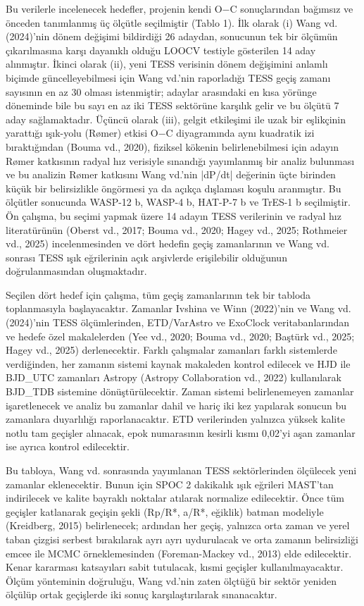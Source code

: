 Bu verilerle incelenecek hedefler, projenin kendi O−C sonuçlarından bağımsız ve önceden tanımlanmış üç ölçütle seçilmiştir (Tablo 1). İlk olarak (i) Wang vd. (2024)'nin dönem değişimi bildirdiği 26 adaydan, sonucunun tek bir ölçümün çıkarılmasına karşı dayanıklı olduğu LOOCV testiyle gösterilen 14 aday alınmıştır. İkinci olarak (ii), yeni TESS verisinin dönem değişimini anlamlı biçimde güncelleyebilmesi için Wang vd.'nin raporladığı TESS geçiş zamanı sayısının en az 30 olması istenmiştir; adaylar arasındaki en kısa yörünge döneminde bile bu sayı en az iki TESS sektörüne karşılık gelir ve bu ölçütü 7 aday sağlamaktadır. Üçüncü olarak (iii), gelgit etkileşimi ile uzak bir eşlikçinin yarattığı ışık-yolu (Rømer) etkisi O−C diyagramında aynı kuadratik izi bıraktığından (Bouma vd., 2020), fiziksel kökenin belirlenebilmesi için adayın Rømer katkısının radyal hız verisiyle sınandığı yayımlanmış bir analiz bulunması ve bu analizin Rømer katkısını Wang vd.'nin |dP/dt| değerinin üçte birinden küçük bir belirsizlikle öngörmesi ya da açıkça dışlaması koşulu aranmıştır. Bu ölçütler sonucunda WASP-12 b, WASP-4 b, HAT-P-7 b ve TrES-1 b seçilmiştir. Ön çalışma, bu seçimi yapmak üzere 14 adayın TESS verilerinin ve radyal hız literatürünün (Oberst vd., 2017; Bouma vd., 2020; Hagey vd., 2025; Rothmeier vd., 2025) incelenmesinden ve dört hedefin geçiş zamanlarının ve Wang vd. sonrası TESS ışık eğrilerinin açık arşivlerde erişilebilir olduğunun doğrulanmasından oluşmaktadır.

Seçilen dört hedef için çalışma, tüm geçiş zamanlarının tek bir tabloda toplanmasıyla başlayacaktır. Zamanlar Ivshina ve Winn (2022)'nin ve Wang vd. (2024)'nin TESS ölçümlerinden, ETD/VarAstro ve ExoClock veritabanlarından ve hedefe özel makalelerden (Yee vd., 2020; Bouma vd., 2020; Baştürk vd., 2025; Hagey vd., 2025) derlenecektir. Farklı çalışmalar zamanları farklı sistemlerde verdiğinden, her zamanın sistemi kaynak makaleden kontrol edilecek ve HJD ile BJD\_UTC zamanları Astropy (Astropy Collaboration vd., 2022) kullanılarak BJD\_TDB sistemine dönüştürülecektir. Zaman sistemi belirlenemeyen zamanlar işaretlenecek ve analiz bu zamanlar dahil ve hariç iki kez yapılarak sonucun bu zamanlara duyarlılığı raporlanacaktır. ETD verilerinden yalnızca yüksek kalite notlu tam geçişler alınacak, epok numarasının kesirli kısmı 0,02'yi aşan zamanlar ise ayrıca kontrol edilecektir.

Bu tabloya, Wang vd. sonrasında yayımlanan TESS sektörlerinden ölçülecek yeni zamanlar eklenecektir. Bunun için SPOC 2 dakikalık ışık eğrileri MAST'tan indirilecek ve kalite bayraklı noktalar atılarak normalize edilecektir. Önce tüm geçişler katlanarak geçişin şekli (Rp/R*, a/R*, eğiklik) batman modeliyle (Kreidberg, 2015) belirlenecek; ardından her geçiş, yalnızca orta zaman ve yerel taban çizgisi serbest bırakılarak ayrı ayrı uydurulacak ve orta zamanın belirsizliği emcee ile MCMC örneklemesinden (Foreman-Mackey vd., 2013) elde edilecektir. Kenar kararması katsayıları sabit tutulacak, kısmi geçişler kullanılmayacaktır. Ölçüm yönteminin doğruluğu, Wang vd.'nin zaten ölçtüğü bir sektör yeniden ölçülüp ortak geçişlerde iki sonuç karşılaştırılarak sınanacaktır.

